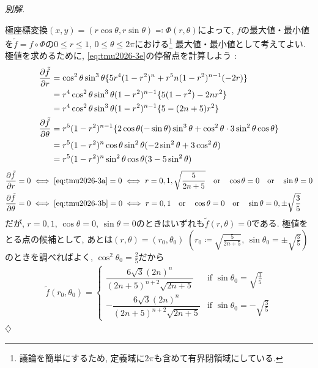 \documentclass[titlepage]{jsarticle}
\numberwithin{equation}{section}
\newenvironment{kaitou}[1][解]{%
\begin{proofbox}%
\textit{#1. }\ignorespaces
}{%
\hfill$\diamondsuit$%
\end{proofbox}%
}
\begin{document}
\begin{kaitou}[別解]
極座標変換$(x, y) = (r\cos\theta, r\sin\theta) \eqcolon \Phi(r, \theta)$によって, $f$の最大値・最小値を$\tilde{f} = f \circ \Phi$の$0 \le r \le 1,\,0 \le \theta \le 2\pi$における\footnote{議論を簡単にするため, 定義域に$2\pi$も含めて有界閉領域にしている.} 最大値・最小値として考えてよい. 極値を求めるために, \eqref{eq:tmu2026-3e}の停留点を計算しよう : 
\begin{align}
\dfrac{\partial \tilde{f}}{\partial r} &= \cos^2\theta\sin^3\theta\{5r^4(1-r^2)^n + r^5n(1-r^2)^{n-1}(-2r)\} \notag\\
&= r^4\cos^2\theta\sin^3\theta(1 - r^2)^{n-1}\{5(1-r^2)-2nr^2\}\notag\\
&= r^4\cos^2\theta\sin^3\theta(1-r^2)^{n-1}\{5 - (2n+5)r^2\} \label{eq:tmu2026-3a}\\
\dfrac{\partial \tilde{f}}{\partial \theta} &= r^5(1 - r^2)^{n-1}\{2\cos\theta(-\sin\theta)\sin^3\theta + \cos^2\theta\cdot3\sin^2\theta\cos\theta\}\notag\\
&= r^5(1-r^2)^n\cos\theta\sin^2\theta(-2\sin^2\theta + 3\cos^2\theta)\notag\\
&= r^5(1-r^2)^n\sin^2\theta\cos\theta(3 - 5\sin^2\theta) \label{eq:tmu2026-3b}
\end{align}
\begin{align}
\dfrac{\partial \tilde{f}}{\partial r} = 0 &\iff \eqref{eq:tmu2026-3a} = 0 \iff r = 0, 1, \sqrt{\frac{5}{2n+5}}\quad\text{or}\quad\cos\theta = 0\quad\text{or}\quad\sin\theta = 0\label{eq:tmu2026-3c}\\
\dfrac{\partial \tilde{f}}{\partial \theta} = 0 &\iff \eqref{eq:tmu2026-3b} = 0 \iff r = 0, 1 \quad\text{or}\quad\cos\theta = 0\quad\text{or}\quad\sin\theta = 0 ,\pm\sqrt{\dfrac{3}{5}}  \label{eq:tmu2026-3d}
\end{align}
だが, $r = 0, 1,\, \cos\theta = 0,\,\sin\theta = 0$のときはいずれも$\tilde{f}(r, \theta) = 0$である. 極値をとる点の候補として, あとは$(r, \theta) = \left(r_0, \theta_0\right)\,\,\left(r_0 \coloneq \sqrt{\frac{5}{2n + 5}},\,\sin\theta_0 = \pm\sqrt{\frac{3}{5}}\right)$のときを調べればよく, $\cos^2\theta_0 = \frac{2}{5}$だから
\begin{align}
\tilde{f}(r_0, \theta_0) =
\begin{cases}
\dfrac{6\sqrt{3}(2n)^n}{(2n + 5)^{n + 2}\sqrt{2n+5}} & \text{if}\,\,\sin\theta_0 = \sqrt{\frac{3}{5}}\\
-\dfrac{6\sqrt{3}(2n)^n}{(2n + 5)^{n + 2}\sqrt{2n+5}} & \text{if}\,\,\sin\theta_0 = -\sqrt{\frac{3}{5}}
\end{cases}

\end{align}
\end{kaitou}
\end{document}
